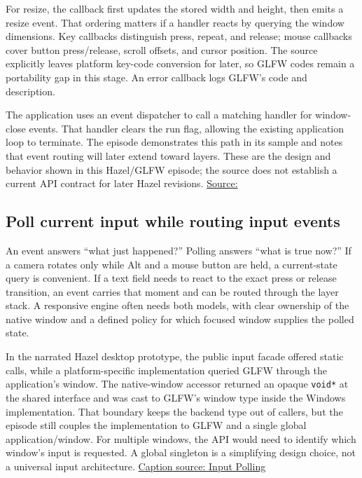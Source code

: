 For resize, the callback first updates the stored width and height, then emits a resize event. That ordering matters if a handler reacts by querying the window dimensions. Key callbacks distinguish press, repeat, and release; mouse callbacks cover button press/release, scroll offsets, and cursor position. The source explicitly leaves platform key-code conversion for later, so GLFW codes remain a portability gap in this stage. An error callback logs GLFW's code and description.

The application uses an event dispatcher to call a matching handler for window-close events. That handler clears the run flag, allowing the existing application loop to terminate. The episode demonstrates this path in its sample and notes that event routing will later extend toward layers. These are the design and behavior shown in this Hazel/GLFW episode; the source does not establish a current API contract for later Hazel revisions. \href{https://www.youtube.com/watch?v=r74WxFMIEdU}{Source:}

\subsection{Poll current input while routing input events}\label{05-engine-i-ch013-poll-current-input-while-routing-input-events}

An event answers ``what just happened?'' Polling answers ``what is true now?'' If a camera rotates only while Alt and a mouse button are held, a current-state query is convenient. If a text field needs to react to the exact press or release transition, an event carries that moment and can be routed through the layer stack. A responsive engine often needs both models, with clear ownership of the native window and a defined policy for which focused window supplies the polled state.

In the narrated Hazel desktop prototype, the public input facade offered static calls, while a platform-specific implementation queried GLFW through the application's window. The native-window accessor returned an opaque \texttt{void*} at the shared interface and was cast to GLFW's window type inside the Windows implementation. That boundary keeps the backend type out of callers, but the episode still couples the implementation to GLFW and a single global application/window. For multiple windows, the API would need to identify which window's input is requested. A global singleton is a simplifying design choice, not a universal input architecture. \href{https://www.youtube.com/watch?v=yuhNj8yGDJQ}{Caption source: Input Polling}

